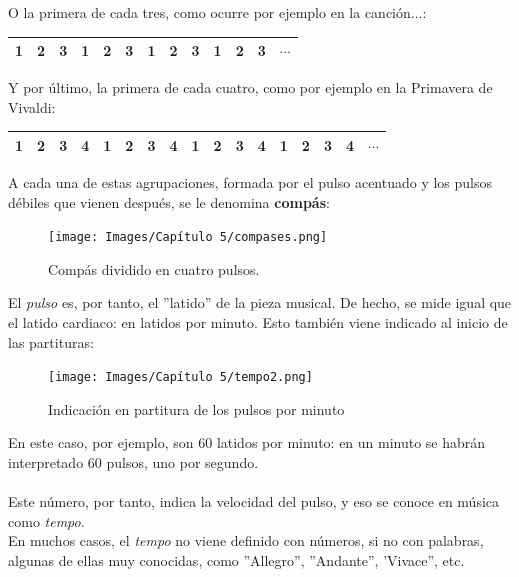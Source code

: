 \documentclass[a4paper, openright, 11pt, titlepage]{report}
\theoremstyle{definition}\newtheorem{defin}[propo]{Definition}
\theoremstyle{definition}\newtheorem{obser}[propo]{Remark}
\theoremstyle{definition}\newtheorem{ejem}[propo]{Ejemplo}
\theoremstyle{definition}\newtheorem{algoritmo}[propo]{Algoritmo}
\begin{document}
O la primera de cada tres, como ocurre por ejemplo en la canción...:
\begin{table}[H]
    \centering
    \begin{tabular}{|c|c|c|c|c|c|c|c|c|c|c|c|c|}
    \hline
        \cellcolor{acento}1 & 2 & 3 & \cellcolor{acento}1 & 2 & 3 & \cellcolor{acento}1 & 2 & 3 & \cellcolor{acento}1 & 2 & 3 & $\cdots$ \\
    \hline
    \end{tabular}
\end{table}
Y por último, la primera de cada cuatro, como por ejemplo en la Primavera de Vivaldi:
\begin{table}[H]
    \centering
    \begin{tabular}{|c|c|c|c|c|c|c|c|c|c|c|c|c|c|c|c|c|}
    \hline
        \cellcolor{acento}1 & 2 & 3 & 4 & \cellcolor{acento}1 & 2 & 3 & 4 & \cellcolor{acento}1 & 2 & 3 & 4 & \cellcolor{acento}1 & 2 & 3 & 4 & $\cdots$ \\
    \hline
    \end{tabular}
\end{table}
A cada una de estas agrupaciones, formada por el pulso acentuado y los pulsos débiles que vienen después, se le denomina \textbf{compás}:
\begin{figure}[H]
    \centering
    \texttt{[image: Images/Capítulo 5/compases.png]}
    \caption{Compás dividido en cuatro pulsos.}
\end{figure}
El \textit{pulso} es, por tanto, el ''latido'' de la pieza musical. De hecho, se mide igual que el latido cardiaco: en latidos por minuto. Esto también viene indicado al inicio de las partituras:
\begin{figure}[H]
    \centering
    \texttt{[image: Images/Capítulo 5/tempo2.png]}
    \caption{Indicación en partitura de los pulsos por minuto}
\end{figure}
En este caso, por ejemplo, son 60 latidos por minuto: en un minuto se habrán interpretado 60 pulsos, uno por segundo.\\\\
Este número, por tanto, indica la velocidad del pulso, y eso se conoce en música como \textit{tempo}.\\ En muchos casos, el \textit{tempo} no viene definido con números, si no con palabras, algunas de ellas muy conocidas, como ''Allegro'', ''Andante'', 'Vivace'', etc.
\end{document}
